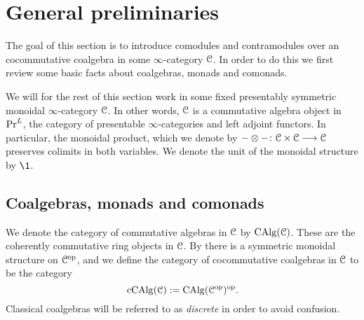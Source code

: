 
\section{General preliminaries}

The goal of this section is to introduce comodules and contramodules over an cocommutative coalgebra in some $\infty$-category $\EuScript{C}$. In order to do this we first review some basic facts about coalgebras, monads and comonads. 

We will for the rest of this section work in some fixed presentably symmetric monoidal $\infty$-category $\EuScript{C}$. In other words, $\EuScript{C}$ is a commutative algebra object in $\mathrm{Pr}^L$, the category of presentable $\infty$-categories and left adjoint functors. In particular, the monoidal product, which we denote by $-\otimes-\colon\EuScript{C}\times \EuScript{C}\longrightarrow\EuScript{C}$ preserves colimits in both variables. We denote the unit of the monoidal structure by $\1$. 


\subsection{Coalgebras, monads and comonads}

We denote the category of commutative algebras in $\EuScript{C}$ by $\operatorname{CAlg}(\EuScript{C})$. These are the coherently commutative ring objects in $\EuScript{C}$. By \cite[2.4.2.7]{Lurie_HA} there is a symmetric monoidal structure on $\EuScript{C}^{\mathrm{op}}$, and we define the category of cocommutative coalgebras in $\EuScript{C}$ to be the category 
\[\operatorname{cCAlg}(\EuScript{C}):= \operatorname{CAlg}(\EuScript{C}^{\mathrm{op}})^{\mathrm{op}}.\] 
Classical coalgebras will be referred to as \emph{discrete} in order to avoid confusion. 

